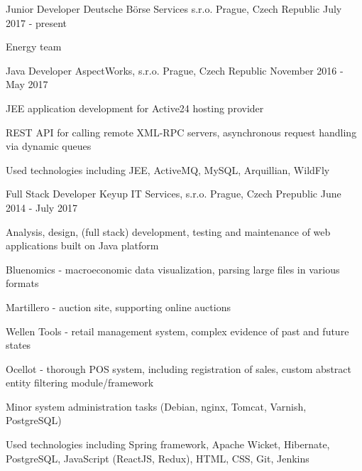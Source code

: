 \begin{cventries}
  \cventry
	{Junior Developer}
	{Deutsche Börse Services s.r.o.}
	{Prague, Czech Republic}
	{July 2017 - present}
	{
	  \begin{cvitems}
	    \item {Energy team}
	  \end{cvitems}
	}
  \cventry
    {Java Developer}
    {AspectWorks, s.r.o.}
    {Prague, Czech Republic}
    {November 2016 - May 2017}
    {
      \begin{cvitems}
        \item {JEE application development for Active24 hosting provider}
        \item {REST API for calling remote XML-RPC servers, asynchronous request handling via dynamic queues}
        \item {Used technologies including JEE, ActiveMQ, MySQL, Arquillian, WildFly}
      \end{cvitems}
    }
  \cventry
    {Full Stack Developer}
    {Keyup IT Services, s.r.o.}
    {Prague, Czech Prepublic}
    {June 2014 - July 2017}
    {
      \begin{cvitems}
        \item {Analysis, design, (full stack) development, testing and maintenance of web applications built on Java platform}
        \item {Bluenomics - macroeconomic data visualization, parsing large files in various formats}
        \item {Martillero - auction site, supporting online auctions}
        \item {Wellen Tools - retail management system, complex evidence of past and future states}
        \item {Ocellot - thorough POS system, including registration of sales, custom abstract entity filtering module/framework}
        \item {Minor system administration tasks (Debian, nginx, Tomcat, Varnish, PostgreSQL)}
        \item {Used technologies including Spring framework, Apache Wicket, Hibernate, PostgreSQL, JavaScript (ReactJS, Redux), HTML, CSS, Git, Jenkins}
      \end{cvitems}
    }
\end{cventries}
